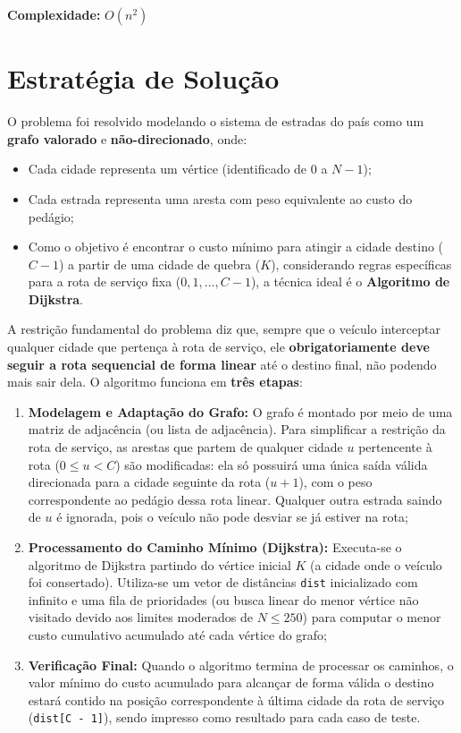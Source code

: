 \documentclass[
    12pt,
    oneside,
    a4paper,
    brazil
]{abntex2}
\begin{document}
\textbf{Complexidade:} $O(n^2)$

\section{Estratégia de Solução}

O problema foi resolvido modelando o sistema de estradas do país como um \textbf{grafo valorado} e \textbf{não-direcionado}, onde:
\begin{itemize}
	\item{Cada cidade representa um vértice (identificado de $0$ a $N-1$);}
	\item{Cada estrada representa uma aresta com peso equivalente ao custo do pedágio;}
	\item{Como o objetivo é encontrar o custo mínimo para atingir a cidade destino ($C-1$) a partir de uma cidade de quebra ($K$), considerando regras específicas para a rota de serviço fixa ($0, 1, \dots, C-1$), a técnica ideal é o \textbf{Algoritmo de Dijkstra}.}
\end{itemize}

A restrição fundamental do problema diz que, sempre que o veículo interceptar qualquer cidade que pertença à rota de serviço, ele \textbf{obrigatoriamente deve seguir a rota sequencial de forma linear} até o destino final, não podendo mais sair dela. O algoritmo funciona em \textbf{três etapas}:
\begin{enumerate}
	\item{\textbf{Modelagem e Adaptação do Grafo:} O grafo é montado por meio de uma matriz de adjacência (ou lista de adjacência). Para simplificar a restrição da rota de serviço, as arestas que partem de qualquer cidade $u$ pertencente à rota ($0 \le u < C$) são modificadas: ela só possuirá uma única saída válida direcionada para a cidade seguinte da rota ($u + 1$), com o peso correspondente ao pedágio dessa rota linear. Qualquer outra estrada saindo de $u$ é ignorada, pois o veículo não pode desviar se já estiver na rota;}
	\item{\textbf{Processamento do Caminho Mínimo (Dijkstra):} Executa-se o algoritmo de Dijkstra partindo do vértice inicial $K$ (a cidade onde o veículo foi consertado). Utiliza-se um vetor de distâncias \texttt{dist} inicializado com infinito e uma fila de prioridades (ou busca linear do menor vértice não visitado devido aos limites moderados de $N \le 250$) para computar o menor custo cumulativo acumulado até cada vértice do grafo;}
	\item{\textbf{Verificação Final:} Quando o algoritmo termina de processar os caminhos, o valor mínimo do custo acumulado para alcançar de forma válida o destino estará contido na posição correspondente à última cidade da rota de serviço (\texttt{dist[C - 1]}), sendo impresso como resultado para cada caso de teste.}
\end{enumerate}
\end{document}
